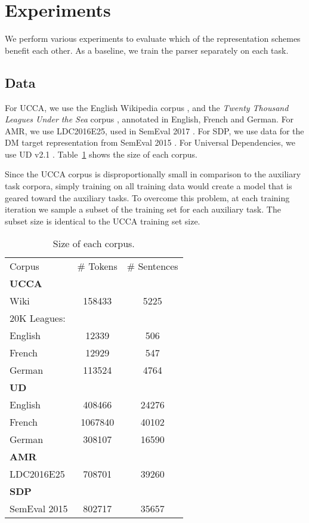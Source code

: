 \documentclass[11pt,a4paper]{article}
\begin{document}
\section{Experiments}\label{sec:experiments}

We perform various experiments to evaluate which of the representation schemes benefit each other.
As a baseline, we train the parser separately on each task.

\subsection{Data}\label{sec:data}

For UCCA, we use the English Wikipedia corpus \cite{abend2013universal},
and the \textit{Twenty Thousand Leagues Under the Sea} corpus \cite[20K leagues;][]{sulem2015conceptual},
annotated in English, French and German.
For AMR, we use LDC2016E25, used in SemEval 2017 \cite{may2017semeval}.
For SDP, we use data for the DM target representation from SemEval 2015 \cite{oepen2015semeval}.
For Universal Dependencies, we use UD v2.1 \cite{11234/1-2515}.
Table~\ref{tab:corpora} shows the size of each corpus.

Since the UCCA corpus is disproportionally small in comparison to the auxiliary task corpora,
simply training on all training data would create a model that is geared toward the auxiliary tasks.
To overcome this problem,
at each training iteration we sample a subset of the training set for each auxiliary task.
The subset size is identical to the UCCA training set size.

\begin{table}
\begin{tabular}{lcc}
Corpus & \# Tokens & \# Sentences \\
\textbf{UCCA} \\
Wiki & 158433 & 5225 \\
20K Leagues: \\
English & 12339 & 506 \\
French & 12929 & 547 \\
German & 113524 & 4764 \\
\textbf{UD} \\
English & 408466 & 24276 \\
French & 1067840 & 40102 \\
German & 308107 & 16590 \\
\textbf{AMR} \\
LDC2016E25 & 708701 & 39260 \\
\textbf{SDP} \\
SemEval 2015 & 802717 & 35657 \\
\end{tabular}
\caption{Size of each corpus.\label{tab:corpora}}
\end{table}
\end{document}
